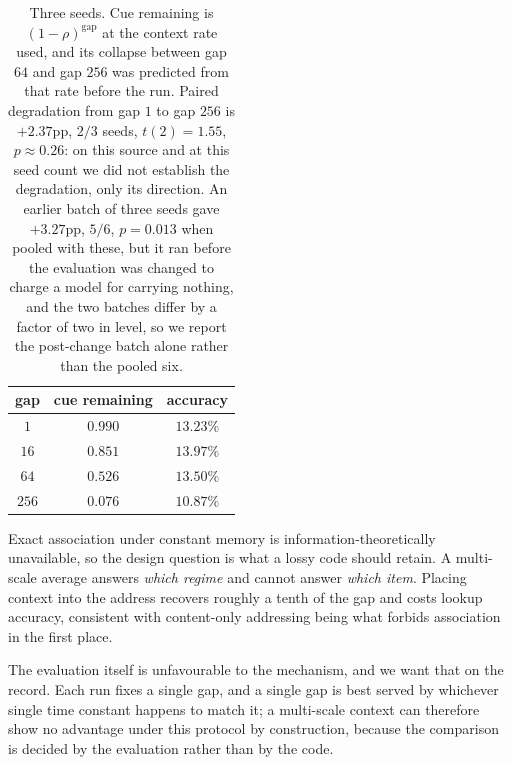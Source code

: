 \documentclass[11pt,a4paper]{article}
\begin{document}
\begin{table}[h]
\centering
\begin{tabular}{ccc}
\toprule
gap & cue remaining & accuracy \\
\midrule
$1$ & $0.990$ & $13.23\%$ \\
$16$ & $0.851$ & $13.97\%$ \\
$64$ & $0.526$ & $13.50\%$ \\
$256$ & $0.076$ & $10.87\%$ \\
\bottomrule
\end{tabular}
\caption{Three seeds. Cue remaining is $(1-\rho)^{\text{gap}}$ at the context
rate used, and its collapse between gap $64$ and gap $256$ was predicted from
that rate before the run. Paired degradation from gap $1$ to gap $256$ is
$+2.37$pp, $2/3$ seeds, $t(2)=1.55$, $p\approx0.26$: on this source and at this
seed count we did not establish the degradation, only its direction. An earlier
batch of three seeds gave $+3.27$pp, $5/6$, $p=0.013$ when pooled with these,
but it ran before the evaluation was changed to charge a model for carrying
nothing, and the two batches differ by a factor of two in level, so we report
the post-change batch alone rather than the pooled six.}
\end{table}

Exact association under constant memory is information-theoretically
unavailable, so the design question is what a lossy code should retain. A
multi-scale average answers \emph{which regime} and cannot answer \emph{which
item}. Placing context into the address recovers roughly a tenth of the gap and
costs lookup accuracy, consistent with content-only addressing being what
forbids association in the first place.

The evaluation itself is unfavourable to the mechanism, and we want that on
the record. Each run fixes a single gap, and a single gap is best served by
whichever single time constant happens to match it; a multi-scale context can
therefore show no advantage under this protocol by construction, because the
comparison is decided by the evaluation rather than by the code.
\end{document}
